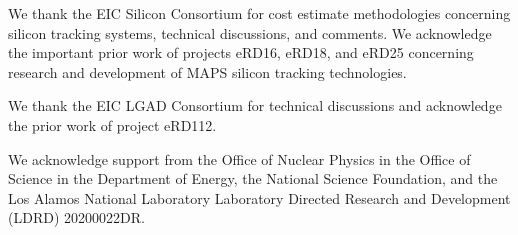 
We thank the EIC Silicon Consortium for cost estimate methodologies concerning silicon tracking systems, technical discussions, and comments.  We acknowledge the important prior work of projects eRD16, eRD18, and eRD25 concerning research and development of MAPS silicon tracking technologies.

We thank the EIC LGAD Consortium for technical discussions and acknowledge the prior work of project eRD112.

We acknowledge support from the Office of Nuclear Physics in the Office of Science in the Department of Energy, the National Science Foundation, and the Los Alamos National Laboratory Laboratory Directed Research and Development (LDRD) 20200022DR.